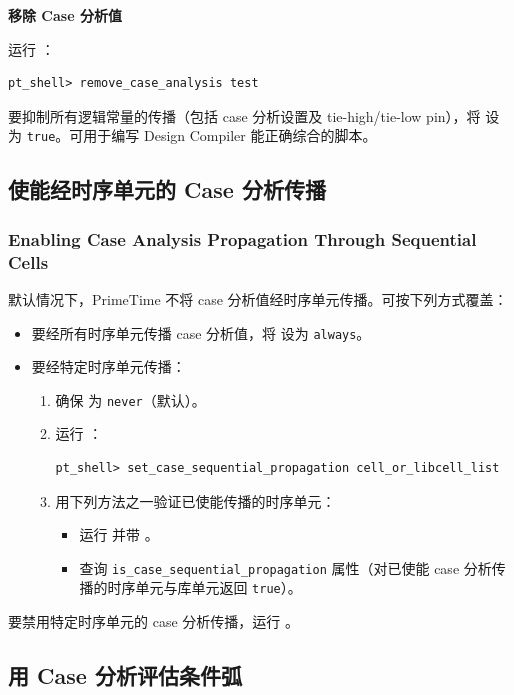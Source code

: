 \textbf{移除 Case 分析值}

运行 ：
\begin{lstlisting}
pt_shell> remove_case_analysis test
\end{lstlisting}

要抑制所有逻辑常量的传播（包括 case 分析设置及 tie-high/tie-low pin），将  设为 \texttt{true}。可用于编写 Design Compiler 能正确综合的脚本。

\subsection{使能经时序单元的 Case 分析传播}
\subsubsection*{Enabling Case Analysis Propagation Through Sequential Cells}

默认情况下，PrimeTime 不将 case 分析值经时序单元传播。可按下列方式覆盖：
\begin{itemize}
  \item 要经所有时序单元传播 case 分析值，将  设为 \texttt{always}。
  \item 要经特定时序单元传播：
  \begin{enumerate}
    \item 确保  为 \texttt{never}（默认）。
    \item 运行 ：
\begin{lstlisting}
pt_shell> set_case_sequential_propagation cell_or_libcell_list
\end{lstlisting}
    \item 用下列方法之一验证已使能传播的时序单元：
    \begin{itemize}
      \item 运行  并带 。
      \item 查询 \texttt{is\_case\_sequential\_propagation} 属性（对已使能 case 分析传播的时序单元与库单元返回 \texttt{true}）。
    \end{itemize}
  \end{enumerate}
\end{itemize}

要禁用特定时序单元的 case 分析传播，运行 。

\subsection{用 Case 分析评估条件弧}
